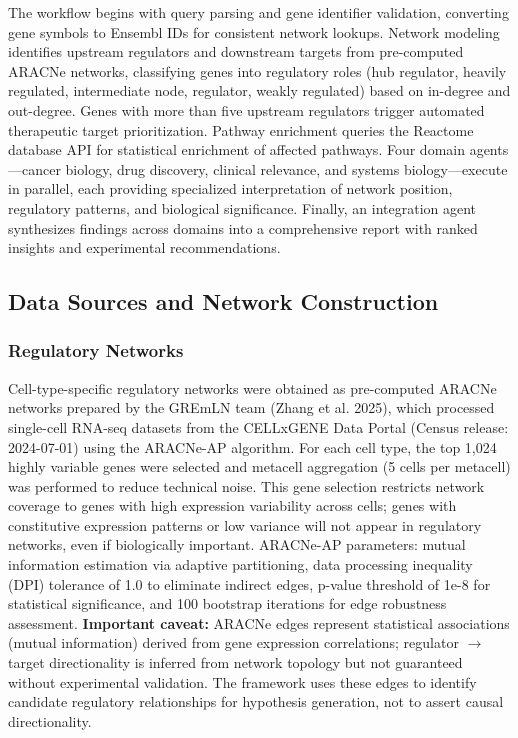 \documentclass[11pt]{article}
\begin{document}
The workflow begins with query parsing and gene identifier validation, converting gene symbols to Ensembl IDs for consistent network lookups. Network modeling identifies upstream regulators and downstream targets from pre-computed ARACNe networks, classifying genes into regulatory roles (hub regulator, heavily regulated, intermediate node, regulator, weakly regulated) based on in-degree and out-degree. Genes with more than five upstream regulators trigger automated therapeutic target prioritization. Pathway enrichment queries the Reactome database API for statistical enrichment of affected pathways. Four domain agents---cancer biology, drug discovery, clinical relevance, and systems biology---execute in parallel, each providing specialized interpretation of network position, regulatory patterns, and biological significance. Finally, an integration agent synthesizes findings across domains into a comprehensive report with ranked insights and experimental recommendations.

\subsection{Data Sources and Network Construction}

\subsubsection{Regulatory Networks}

Cell-type-specific regulatory networks were obtained as pre-computed ARACNe networks prepared by the GREmLN team (Zhang et al. 2025), which processed single-cell RNA-seq datasets from the CELLxGENE Data Portal (Census release: 2024-07-01) using the ARACNe-AP algorithm. For each cell type, the top 1,024 highly variable genes were selected and metacell aggregation (5 cells per metacell) was performed to reduce technical noise. This gene selection restricts network coverage to genes with high expression variability across cells; genes with constitutive expression patterns or low variance will not appear in regulatory networks, even if biologically important. ARACNe-AP parameters: mutual information estimation via adaptive partitioning, data processing inequality (DPI) tolerance of 1.0 to eliminate indirect edges, p-value threshold of 1e-8 for statistical significance, and 100 bootstrap iterations for edge robustness assessment. \textbf{Important caveat:} ARACNe edges represent statistical associations (mutual information) derived from gene expression correlations; regulator $\rightarrow$ target directionality is inferred from network topology but not guaranteed without experimental validation. The framework uses these edges to identify candidate regulatory relationships for hypothesis generation, not to assert causal directionality.
\end{document}
